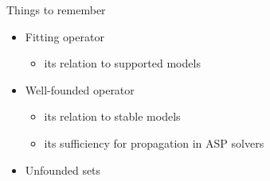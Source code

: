 \begin{frame}{Things to remember}
  \medskip
  \begin{itemize}
  \item Fitting operator
    \begin{itemize}\normalsize
    \item its relation to supported models
    \end{itemize}
  \item Well-founded operator
    \begin{itemize}\normalsize
    \item its relation to stable models
    \item its sufficiency for propagation in ASP solvers
    \end{itemize}
  \item Unfounded sets
  \end{itemize}
\end{frame}
%
